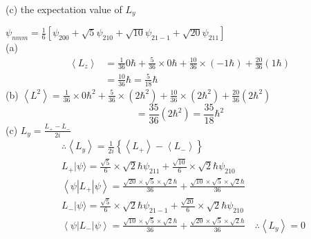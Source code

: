 \begin{enumerate}
\begin{minipage}{\textwidth}
	(c) the expectation value of $L_{y}$
\end{minipage}
\begin{answer}
	$\psi_{n m m}=\frac{1}{6}\left[\psi_{200}+\sqrt{5} \psi_{210}+\sqrt{10} \psi_{21-1}+\sqrt{20} \psi_{211}\right]$\\
 (a)\begin{align*}
		\left\langle L_{z}\right\rangle &=\frac{1}{36} 0 \hbar+\frac{5}{36} \times 0 \hbar+\frac{10}{36} \times(-1 \hbar)+\frac{20}{36}(1 \hbar) \\
		&=\frac{10}{36} \hbar=\frac{5}{18} \hbar
	\end{align*}
	(b) $\left\langle L^{2}\right\rangle=\frac{1}{36} \times 0 \hbar^{2}+\frac{5}{36} \times\left(2 \hbar^{2}\right)+\frac{10}{36} \times\left(2 \hbar^{2}\right)+\frac{20}{36}\left(2 \hbar^{2}\right)$
	$$
	=\frac{35}{36}\left(2 \hbar^{2}\right)=\frac{35}{18} \hbar^{2}
	$$
	(c) $L_{y}=\frac{L_{+}-L_{-}}{2 i}$
	\begin{align*}
	&\therefore\left\langle L_{y}\right\rangle=\frac{1}{2 i}\left\{\left\langle L_{+}\right\rangle-\left\langle L_{-}\right\rangle\right\} \\
	&L_{+}|\psi\rangle=\frac{\sqrt{5}}{6} \times \sqrt{2} \hbar \psi_{211}+\frac{\sqrt{10}}{6} \times \sqrt{2} \hbar \psi_{210} \\
	&\left\langle\psi\left|L_{+}\right| \psi\right\rangle=\frac{\sqrt{20} \times \sqrt{5} \times \sqrt{2} \hbar}{36}+\frac{\sqrt{10} \times \sqrt{5} \times \sqrt{2} \hbar}{36} \\
	&L_{-}|\psi\rangle=\frac{\sqrt{5}}{6} \times \sqrt{2} \hbar \psi_{21-1}+\frac{\sqrt{20}}{6} \times \sqrt{2} \hbar \psi_{210} \\
	&\left\langle\psi\left|L_{-}\right| \psi\right\rangle=\frac{\sqrt{10} \times \sqrt{5} \times \sqrt{2} \hbar}{36}+\frac{\sqrt{20} \times \sqrt{5} \times \sqrt{2} \hbar}{36} \quad \therefore\left\langle L_{y}\right\rangle=0
	\end{align*}
\end{answer}
\end{enumerate}






































